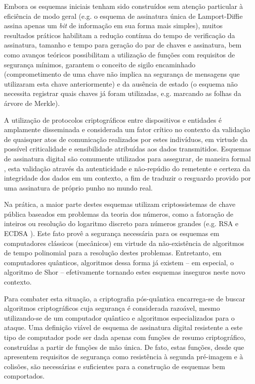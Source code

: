 \documentclass{article}
\begin{document}
Embora os esquemas iniciais tenham sido construídos sem atenção particular à
eficiência de modo geral (e.g. o esquema de assinatura única de Lamport-Diffie
\cite{Lamport1979} assina apenas um \emph{bit} de informação em sua forma mais
simples), muitos resultados práticos habilitam a redução contínua do tempo de
verificação da assinatura, tamanho e tempo para geração do par de chaves e
assinatura, bem como avanços teóricos possibilitam a utilização de funções com
requisitos de segurança mínimos, garantem o conceito de sigilo encaminhado
\cite{Buchmann2011} (comprometimento de uma chave não implica na segurança de
mensagens que utilizaram esta chave anteriormente) e da ausência de estado
\cite{Bernstein2015} (o esquema não necessita registrar quais chaves já foram
utilizadas, e.g. marcando as folhas da árvore de Merkle).

A utilização de protocolos criptográficos entre dispositivos e entidades
é amplamente disseminada e considerada um fator crítico no contexto da
validação de quaisquer atos de comunicação realizados por estes indivíduos,
em virtude da possível criticalidade e sensibilidade atribuídas aos dados
transmitidos. Esquemas de assinatura digital são comumente utilizados para
assegurar, de maneira formal \cite{Goldreich:2004:FCV:975541}, esta validação
através da autenticidade e não-repúdio do remetente e certeza da integridade
dos dados em um contexto, a fim de traduzir o resguardo provido por uma
assinatura de próprio punho no mundo real.

Na prática, a maior parte destes esquemas utilizam criptossistemas de
chave pública baseados em problemas da teoria dos números, como a
fatoração de inteiros ou resolução do logaritmo discreto para números
grandes (e.g. RSA \cite{Rivest:1978:MOD:359340.359342}
e ECDSA \cite{Johnson2001}). Este fato provê a segurança necessária para
os esquemas em computadores clássicos (mecânicos) em virtude da
não-existência de algoritmos de tempo polinomial para a resolução destes
problemas. Entretanto, em computadores quânticos, algoritmos dessa forma
já existem -- em especial, o algoritmo de Shor \cite{Shor:1997:PAP:264393.264406}
-- efetivamente tornando estes esquemas inseguros neste novo
contexto. 

Para combater esta situação, a criptografia pós-quântica encarrega-se
de buscar algoritmos criptográficos cuja segurança é considerada razoável,
mesmo utilizando-se de um computador quântico e algoritmos especializados
para o ataque. Uma definição viável de esquema de assinatura digital
resistente a este tipo de computador pode ser dada apenas com funções de
resumo criptográfico, construídas a partir de funções de mão única. De fato,
estas funções, desde que apresentem requisitos de segurança como resistência
à segunda pré-imagem e à colisões, são necessárias e suficientes para a
construção de esquemas bem comportados. \cite{Rompel:1990:OFN:100216.100269}
\end{document}
